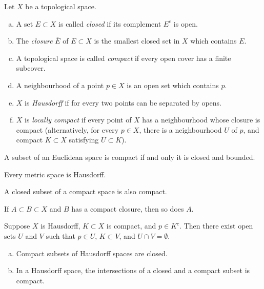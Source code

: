 \begin{definition}
  Let $X$ be a topological space.
  \begin{enumerate}[(a)]
  \item A set $E \subset X$ is called \emph{closed} if its complement $E^c$ is open.
  \item The \emph{closure} $\overline{E}$ of $E \subset X$ is the smallest closed set in $X$ which contains $E$.
  \item A topological space is called \emph{compact} if every open cover has a finite subcover.
  \item A neighbourhood of a point $p \in X$ is an open set which contains $p$.
  \item $X$ is \emph{Hausdorff} if for every two points can be separated by opens.
  \item $X$ is \emph{locally compact} if every point of $X$ has a neighbourhood whose closure is compact (alternatively, for every $p \in X$, there is a neighbourhood $U$ of $p$, and compact $K \subset X$ satisfying $U \subset K$).
  \end{enumerate}
\end{definition}

\begin{theorem}
  A subset of an Euclidean space is compact if and only it is closed and bounded.
\end{theorem}

\begin{proposition}
  Every metric space is Hausdorff.
\end{proposition}

\begin{theorem}
  A closed subset of a compact space is also compact.
\end{theorem}

\begin{corollary}
  If $A \subset B \subset X$ and $B$ has a compact closure, then so does $A$.
\end{corollary}

\begin{theorem}
  Suppose $X$ is Hausdorff, $K \subset X$ is compact, and $p \in K^c$. Then there exist open sets $U$ and $V$ such that $p \in U$, $K \subset V$, and $U \cap V = \emptyset$.
\end{theorem}

\begin{corollary}
  \mbox{}
  \begin{enumerate}[(a)]
  \item Compact subsets of Hausdorff spaces are closed.
  \item In a Hausdorff space, the intersections of a closed and a compact subset is compact.
  \end{enumerate}
\end{corollary}

